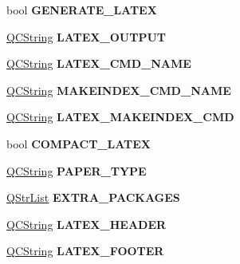 \begin{DoxyCompactItemize}
bool {\bfseries G\+E\+N\+E\+R\+A\+T\+E\+\_\+\+L\+A\+T\+EX}
\item 
\mbox{\label{class_config_values_ac58859d7c4d5327594795de584e85c6f}} 
\mbox{\hyperlink{class_q_c_string}{Q\+C\+String}} {\bfseries L\+A\+T\+E\+X\+\_\+\+O\+U\+T\+P\+UT}
\item 
\mbox{\label{class_config_values_af138c25470d610c22cae8dfadf04f393}} 
\mbox{\hyperlink{class_q_c_string}{Q\+C\+String}} {\bfseries L\+A\+T\+E\+X\+\_\+\+C\+M\+D\+\_\+\+N\+A\+ME}
\item 
\mbox{\label{class_config_values_a307e742ab1ccd9839645571ee2e5d4fb}} 
\mbox{\hyperlink{class_q_c_string}{Q\+C\+String}} {\bfseries M\+A\+K\+E\+I\+N\+D\+E\+X\+\_\+\+C\+M\+D\+\_\+\+N\+A\+ME}
\item 
\mbox{\label{class_config_values_a3cd68a7b155ac55a75edbcdaef50accf}} 
\mbox{\hyperlink{class_q_c_string}{Q\+C\+String}} {\bfseries L\+A\+T\+E\+X\+\_\+\+M\+A\+K\+E\+I\+N\+D\+E\+X\+\_\+\+C\+MD}
\item 
\mbox{\label{class_config_values_a884705a267d1ccf0cfd82c67602c96df}} 
bool {\bfseries C\+O\+M\+P\+A\+C\+T\+\_\+\+L\+A\+T\+EX}
\item 
\mbox{\label{class_config_values_a68532813e4bb8346255f0661b7dd195a}} 
\mbox{\hyperlink{class_q_c_string}{Q\+C\+String}} {\bfseries P\+A\+P\+E\+R\+\_\+\+T\+Y\+PE}
\item 
\mbox{\label{class_config_values_ab59ea7e0a8a795dee6d3e0689bc3c892}} 
\mbox{\hyperlink{class_q_str_list}{Q\+Str\+List}} {\bfseries E\+X\+T\+R\+A\+\_\+\+P\+A\+C\+K\+A\+G\+ES}
\item 
\mbox{\label{class_config_values_a28f6650ad92521ff556f020d530c421b}} 
\mbox{\hyperlink{class_q_c_string}{Q\+C\+String}} {\bfseries L\+A\+T\+E\+X\+\_\+\+H\+E\+A\+D\+ER}
\item 
\mbox{\label{class_config_values_ae16258b9c60d216853fc874e505abe35}} 
\mbox{\hyperlink{class_q_c_string}{Q\+C\+String}} {\bfseries L\+A\+T\+E\+X\+\_\+\+F\+O\+O\+T\+ER}

\end{DoxyCompactItemize}
